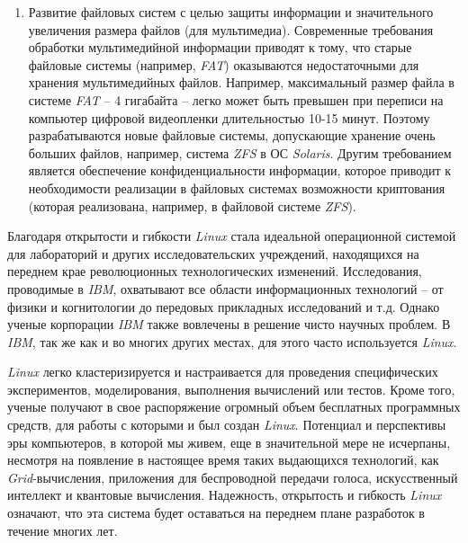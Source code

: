 \begin{enumerate}
	\item Развитие файловых систем с целью защиты информации и значительного увеличения размера файлов (для мультимедиа). Современные требования обработки мультимедийной информации приводят к тому, что старые файловые системы (например, \textit{FAT}) оказываются недостаточными для хранения мультимедийных файлов. Например, максимальный размер файла в системе \textit{FAT} – 4 гигабайта – легко может быть превышен при переписи на компьютер цифровой видеопленки длительностью 10-15 минут. Поэтому разрабатываются новые файловые системы, допускающие хранение очень больших файлов, например, система \textit{ZFS} в ОС \textit{Solaris}. Другим требованием является обеспечение конфиденциальности информации, которое приводит к необходимости реализации в файловых системах возможности криптования (которая реализована, например, в файловой системе \textit{ZFS}).
\end{enumerate}

Благодаря открытости и гибкости \textit{Linux} стала идеальной операционной системой для лабораторий и других исследовательских учреждений, находящихся на переднем крае революционных технологических изменений.  Исследования, проводимые в \textit{IBM}, охватывают все области информационных технологий – от физики и когнитологии до передовых прикладных исследований и т.д. Однако ученые корпорации \textit{IBM} также вовлечены в решение чисто научных проблем.  В \textit{IBM}, так же как и во многих других местах, для этого часто используется \textit{Linux}.

\textit{Linux} легко кластеризируется и настраивается для проведения специфических экспериментов, моделирования, выполнения вычислений или тестов. Кроме того, ученые получают в свое распоряжение огромный объем бесплатных программных средств, для работы с которыми и был создан \textit{Linux}.   Потенциал и перспективы эры компьютеров, в которой мы живем, еще в значительной мере не исчерпаны, несмотря на появление в настоящее время таких выдающихся технологий, как \textit{Grid}-вычисления, приложения для беспроводной передачи голоса, искусственный интеллект и квантовые вычисления. Надежность, открытость и гибкость \textit{Linux} означают, что эта система будет оставаться на переднем плане разработок в течение многих лет.
